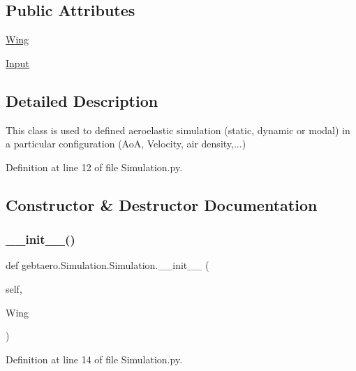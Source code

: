 \subsection*{Public Attributes}
\begin{DoxyCompactItemize}
\item 
\hyperlink{classgebtaero_1_1_simulation_1_1_simulation_a2900b07110293466d8ca5c75ef8e04f8}{Wing}
\item 
\hyperlink{classgebtaero_1_1_simulation_1_1_simulation_ad5005a77e6335eaefeec0af47edc46dc}{Input}
\end{DoxyCompactItemize}


\subsection{Detailed Description}
This class is used to defined aeroelastic simulation (static, dynamic or modal) in a particular configuration (AoA, Velocity, air density,...) 

Definition at line 12 of file Simulation.\+py.



\subsection{Constructor \& Destructor Documentation}
\mbox{\label{classgebtaero_1_1_simulation_1_1_simulation_a865b25fd48ff7aded232e634e28679c3}} 
\subsubsection{\texorpdfstring{\+\_\+\+\_\+init\+\_\+\+\_\+()}{\_\_init\_\_()}}
{\footnotesize\ttfamily def gebtaero.\+Simulation.\+Simulation.\+\_\+\+\_\+init\+\_\+\+\_\+ (\begin{DoxyParamCaption}\item[{}]{self,  }\item[{}]{Wing }\end{DoxyParamCaption})}



Definition at line 14 of file Simulation.\+py.




